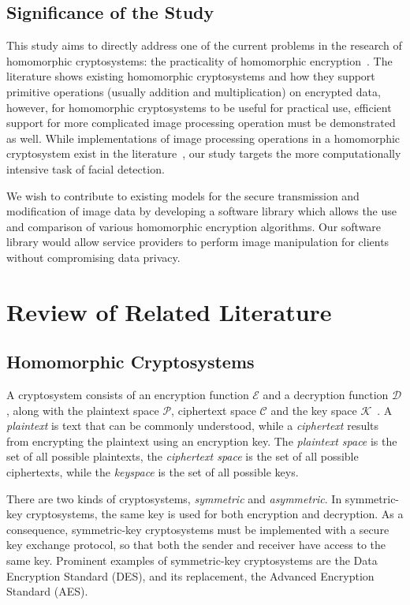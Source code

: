 \subsection{Significance of the Study}
This study aims to directly address one of the current problems in the research of homomorphic cryptosystems: the practicality of homomorphic encryption~\cite{sen_homomorphic_2013}. The literature shows existing homomorphic cryptosystems and how they support primitive operations (usually addition and multiplication) on encrypted data, however, for homomorphic cryptosystems to be useful for practical use, efficient support for more complicated image processing operation must be demonstrated as well. While implementations of image processing operations in a homomorphic cryptosystem exist in the literature~\cite{ziad_cryptoimg:_2016, garay_algorithms_2014}, our study targets the more computationally intensive task of facial detection.

We wish to contribute to existing models for the secure transmission and modification of image data by developing a software library which allows the use and comparison of various homomorphic encryption algorithms. Our software library would allow service providers to perform image manipulation for clients without compromising data privacy.


\section{Review of Related Literature}
\subsection{Homomorphic Cryptosystems}
A cryptosystem consists of an encryption function $\mathcal{E}$ and a decryption function $\mathcal{D}$, along with the plaintext space $\mathcal{P}$, ciphertext space $\mathcal{C}$ and the key space $\mathcal{K}$~\cite{bauer_cryptosystem_2005}. A \textit{plaintext} is text that can be commonly understood, while a \textit{ciphertext} results from encrypting the plaintext using an encryption key. The \textit{plaintext space} is the set of all possible plaintexts, the \textit{ciphertext space} is the set of all possible ciphertexts, while the \textit{keyspace} is the set of all possible keys.

There are two kinds of cryptosystems, \textit{symmetric} and \textit{asymmetric}. In symmetric-key cryptosystems, the same key is used for both encryption and decryption. As a consequence, symmetric-key cryptosystems must be implemented with a secure key exchange protocol, so that both the sender and receiver have access to the same key. Prominent examples of symmetric-key cryptosystems are the Data Encryption Standard (DES), and its replacement, the Advanced Encryption Standard (AES).

